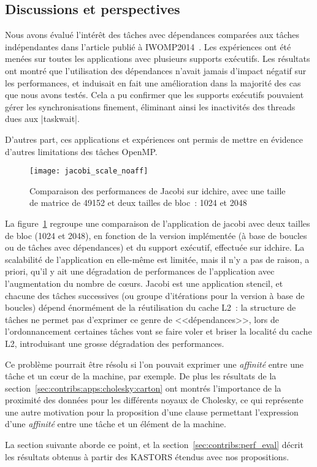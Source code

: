 \subsection{Discussions et perspectives}

Nous avons évalué l'intérêt des tâches avec dépendances comparées aux tâches indépendantes dans l'article publié à IWOMP2014~\cite{Virouleau2014}.
Les expériences ont été menées sur toutes les applications avec plusieurs supports exécutifs.
Les résultats ont montré que l'utilisation des dépendances n'avait jamais d'impact négatif sur les performances, et induisait en fait une amélioration dans la majorité des cas que nous avons testés.
Cela a pu confirmer que les supports exécutifs pouvaient gérer les synchronisations finement, éliminant ainsi les inactivités des threads dues aux |taskwait|.

D'autres part, ces applications et expériences ont permis de mettre en évidence d'autres limitations des tâches OpenMP.

\begin{figure}[ht]
  \centering
  \texttt{[image: jacobi\_scale\_noaff]}
  \caption{Comparaison des performances de Jacobi sur idchire, avec une taille de matrice de 49152 et deux tailles de bloc~: 1024 et 2048}\label{fig:contribs:openmp:kastors:jacobi-motiv}
\end{figure}

La figure~\ref{fig:contribs:openmp:kastors:jacobi-motiv} regroupe une comparaison de l'application de jacobi avec deux tailles de bloc (1024 et 2048), en fonction de la version implémentée (à base de boucles ou de tâches avec dépendances) et du support exécutif, effectuée sur idchire.
La scalabilité de l'application en elle-même est limitée, mais il n'y a pas de raison, a priori, qu'il y ait une dégradation de performances de l'application avec l'augmentation du nombre de cœurs.
Jacobi est une application stencil, et chacune des tâches successives (ou groupe d'itérations pour la version à base de boucles) dépend énormément de la réutilisation du cache L2~: la structure de tâches ne permet pas d'exprimer ce genre de <<dépendances>>, lors de l'ordonnancement certaines tâches vont se faire voler et briser la localité du cache L2, introduisant une grosse dégradation des performances.

Ce problème pourrait être résolu si l'on pouvait exprimer une \emph{affinité} entre une tâche et un cœur de la machine, par exemple.
De plus les résultats de la section~\ref{sec:contribs:apps:cholesky:carton} ont montrés l'importance de la proximité des données pour les différents noyaux de Cholesky, ce qui représente une autre motivation pour la proposition d'une clause permettant l'expression d'une \emph{affinité} entre une tâche et un élément de la machine.

La section suivante aborde ce point, et la section~\ref{sec:contribs:perf_eval} décrit les résultats obtenus à partir des KASTORS étendus avec nos propositions.

